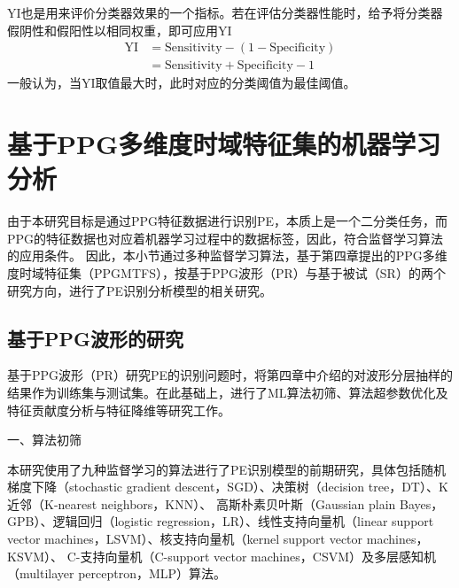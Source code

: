 YI也是用来评价分类器效果的一个指标。若在评估分类器性能时，给予将分类器假阴性和假阳性以相同权重，即可应用YI
\begin{equation}
      \label{equ:yi}
      \begin{aligned}
            \text{YI}&=\text{Sensitivity}-(1-\text{Specificity})\\
            &=\text{Sensitivity}+\text{Specificity}-1
      \end{aligned}
\end{equation}
一般认为，当YI取值最大时，此时对应的分类阈值为最佳阈值\cite{cwl}。

\section{基于PPG多维度时域特征集的机器学习分析}
由于本研究目标是通过PPG特征数据进行识别PE，本质上是一个二分类任务，而PPG的特征数据也对应着机器学习过程中的数据标签，因此，符合监督学习算法的应用条件。
因此，本小节通过多种监督学习算法，基于第四章提出的PPG多维度时域特征集（PPGMTFS），按基于PPG波形（PR）与基于被试（SR）的两个研究方向，进行了PE识别分析模型的相关研究。

\subsection{基于PPG波形的研究}

基于PPG波形（PR）研究PE的识别问题时，将第四章中介绍的对波形分层抽样的结果作为训练集与测试集。在此基础上，进行了ML算法初筛、算法超参数优化及特征贡献度分析与特征降维等研究工作。

一、算法初筛

本研究使用了九种监督学习的算法进行了PE识别模型的前期研究，具体包括随机梯度下降（stochastic gradient descent，SGD）、决策树（decision tree，DT）、K近邻（K-nearest neighbors，KNN）、
高斯朴素贝叶斯（Gaussian plain Bayes，GPB）、逻辑回归（logistic regression，LR）、线性支持向量机（linear support vector machines，LSVM）、核支持向量机（kernel support vector machines，KSVM）、
C-支持向量机（C-support vector machines，CSVM）及多层感知机（multilayer perceptron，MLP）算法。

